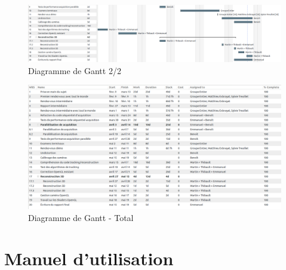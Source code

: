\documentclass{article}
\begin{document}
\newpage
\begin{figure}
	\begin{center}
		\includegraphics[scale=0.3, angle=90]{Modules/Picture/gantt_final_2}
		\caption{Diagramme de Gantt 2/2}
	\end{center}
\end{figure}


\newpage

\begin{figure}[!h]
\centering
\includegraphics[scale=0.35, angle=90]{Modules/Picture/tableau_gantt_final}
\caption{Diagramme de Gantt - Total}
\label{ganttTableau}
\end{figure}

\clearpage

\newpage



\section{Manuel d'utilisation}



\newpage


\nocite{*}


 
\end{document}
